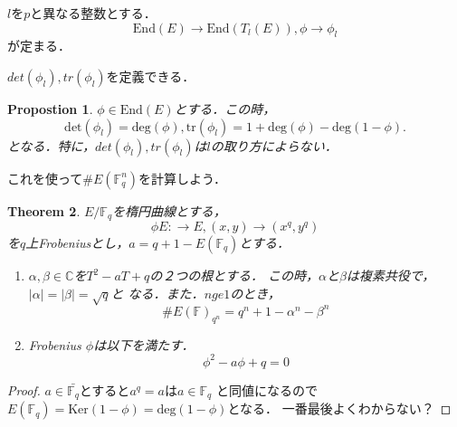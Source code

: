 \documentclass{ujarticle}
\newtheorem{thm}{Theorem}[section]
\newtheorem{prop}[thm]{Propostion}
\begin{document}
$l$を$p$と異なる整数とする．
\begin{equation*}
 \mathrm{End}(E) \to \mathrm{End}(T_l(E)), \phi \to \phi_l
\end{equation*}
が定まる．

$det(\phi_l),tr(\phi_l)$を定義できる．

\begin{prop}
  $\phi \in \mathrm{End}(E)$とする．この時，
  \begin{equation*}
   \mathrm{det}(\phi_l)=\mathrm{deg}(\phi) ,  \mathrm{tr}(\phi_l) = 1 +
   \mathrm{deg}(\phi) - \mathrm{deg}(1 - \phi).
  \end{equation*}
  となる．特に，$det(\phi_l),tr(\phi_l)$は$l$の取り方によらない．
\end{prop}


これを使って$\#E(\mathbb{F}_q^n)$を計算しよう．
\begin{thm}
 $E/\mathbb{F}_q$を楕円曲線とする，
 \begin{equation*}
  \phi E: \to E, (x,y) \to (x^q,y^q)
 \end{equation*}
 を$q$上Frobeniusとし，$a = q+1 -E(\mathbb{F}_q)$とする．
 \begin{enumerate}
   \item $\alpha,\beta \in \mathbb{C}$を$T^2 -aT +q$の２つの根とする．
   この時，$\alpha$と$\beta$は複素共役で，$| \alpha | =|\beta| = \sqrt{q}$と
   なる．また．$n ge 1$のとき，
   \begin{equation*}
    \#E(\mathbb{F})_{q^n}=q^n +1 -\alpha^n -\beta^n
   \end{equation*}
   \item Frobenius $\phi$は以下を満たす．
   \begin{equation*}
    \phi^2 -a\phi +q =0
   \end{equation*}
 \end{enumerate}
\end{thm}

\begin{proof}
$a \in \bar{\mathbb{F}_q}$とすると$a^q=a$は$a \in \mathbb{F}_q$
と同値になるので$E(\mathbb{F}_{q})=\mathrm{Ker}(1 - \phi)=\mathrm{deg}
(1 - \phi)$となる．
一番最後よくわからない？
\end{proof}
\end{document}
